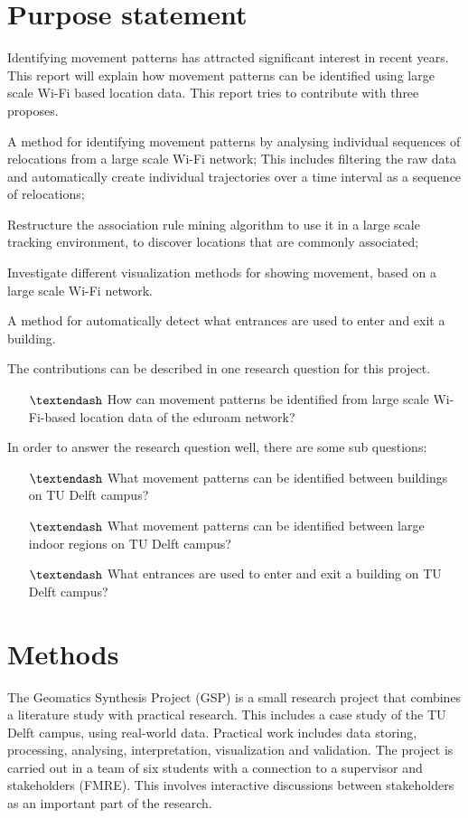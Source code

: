 \section{Purpose statement}\label{purpstate}
Identifying movement patterns has attracted significant interest in recent years. This report will explain how movement patterns can be identified using large scale Wi-Fi based location data. This report tries to contribute with three proposes.
\begin {enumerate*} [label=\itshape\arabic*\upshape),font={\color{red!0!black}\bfseries}] \item A method for identifying movement patterns by analysing individual sequences of relocations from a large scale Wi-Fi network; This includes filtering the raw data and automatically create individual trajectories over a time interval as a sequence of relocations; \item Restructure the association rule mining algorithm to use it in a large scale tracking environment, to discover locations that are commonly associated; \item Investigate different visualization methods for showing movement, based on a large scale Wi-Fi network. \item A method for automatically detect what entrances are used to enter and exit a building.
\end {enumerate*}

The contributions can be described in one research question for this project.
\begin{itemize}
\item[$\textendash$] How can movement patterns be identified from large scale Wi-Fi-based location data of the eduroam network?
\end{itemize}
In order to answer the research question well, there are some sub questions:
\begin{itemize}
\item[$\textendash$] What movement patterns can be identified between buildings on TU Delft campus?
\item[$\textendash$] What movement patterns can be identified between large indoor regions on TU Delft campus?
\item[$\textendash$] What entrances are used to enter and exit a building on TU Delft campus?
\end{itemize}


\section{Methods}\label{methods}
The Geomatics Synthesis Project (GSP) is a small research project that combines a literature study with practical research. This includes a case study of the TU Delft campus, using real-world data. Practical work includes data storing, processing, analysing, interpretation, visualization and validation. The project is carried out in a team of six students with a connection to a supervisor and stakeholders (FMRE). This involves interactive discussions between stakeholders as an important part of the research. 
